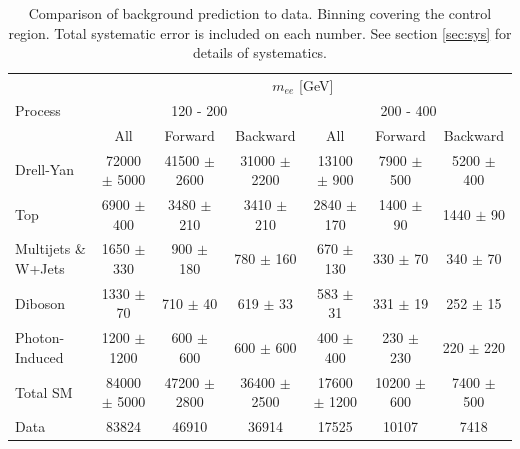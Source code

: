 	\begin {table}[h]
		\scriptsize  
		\begin{center}
		\begin{tabular}{  l | c c c | c c c  } 
			\hline
			\hline
			\multirow{3}{*}{Process} 	& \multicolumn{6}{c}{$m_{ee}$ [GeV]} \\
										& \multicolumn{3}{c}{120 - 200} & \multicolumn{3}{c}{200 - 400} \\
										\cline{2-7}
										& All & Forward & Backward & All & Forward & Backward \\
			\hline
			Drell-Yan & 72000 $\pm$ 5000 & 41500 $\pm$ 2600 & 31000 $\pm$ 2200 & 13100 $\pm$ 900 & 7900 $\pm$ 500 & 5200 $\pm$ 400 \\
			Top & 6900 $\pm$ 400 & 3480 $\pm$ 210 & 3410 $\pm$ 210 & 2840 $\pm$ 170 & 1400 $\pm$ 90 & 1440 $\pm$ 90 \\
			Multijets \& W+Jets & 1650 $\pm$ 330 & 900 $\pm$ 180 & 780 $\pm$ 160 & 670 $\pm$ 130 & 330 $\pm$ 70 & 340 $\pm$ 70 \\
			Diboson & 1330 $\pm$ 70 & 710 $\pm$ 40 & 619 $\pm$ 33 & 583 $\pm$ 31 & 331 $\pm$ 19 & 252 $\pm$ 15 \\
			Photon-Induced & 1200 $\pm$ 1200 & 600 $\pm$ 600 & 600 $\pm$ 600 & 400 $\pm$ 400 & 230 $\pm$ 230 & 220 $\pm$ 220 \\
			\hline
			Total SM & 84000 $\pm$ 5000 & 47200 $\pm$ 2800 & 36400 $\pm$ 2500 & 17600 $\pm$ 1200 & 10200 $\pm$ 600 & 7400 $\pm$ 500 \\
			\hline
			Data & 83824 & 46910 & 36914 & 17525 & 10107 & 7418 \\
			\hline
			\hline
		\end{tabular}
	  	\caption{Comparison of background prediction to data. Binning covering the control region. Total systematic error is included on each number. See section \ref{sec:sys} for details of systematics.}
	  	\label{tab:CI_results0}
	  	\end{center}
	\end {table}

